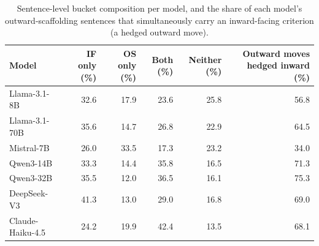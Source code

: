 \begin{table}[t]
\centering
\small
\caption{Sentence-level bucket composition per model, and the share of each model's outward-scaffolding sentences that simultaneously carry an inward-facing criterion (a hedged outward move).}
\label{tab:mixed}
\begin{tabular}{lrrrrr}
\toprule
Model & IF only (\%) & OS only (\%) & Both (\%) & Neither (\%) & Outward moves hedged inward (\%) \\
\midrule
Llama-3.1-8B & 32.6 & 17.9 & 23.6 & 25.8 & 56.8 \\
Llama-3.1-70B & 35.6 & 14.7 & 26.8 & 22.9 & 64.5 \\
Mistral-7B & 26.0 & 33.5 & 17.3 & 23.2 & 34.0 \\
Qwen3-14B & 33.3 & 14.4 & 35.8 & 16.5 & 71.3 \\
Qwen3-32B & 35.5 & 12.0 & 36.5 & 16.1 & 75.3 \\
DeepSeek-V3 & 41.3 & 13.0 & 29.0 & 16.8 & 69.0 \\
Claude-Haiku-4.5 & 24.2 & 19.9 & 42.4 & 13.5 & 68.1 \\
\bottomrule
\end{tabular}
\end{table}
